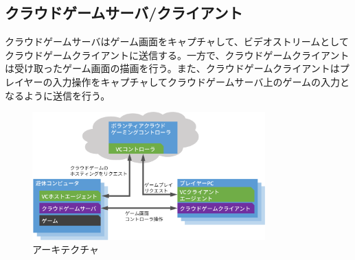 \subsection{クラウドゲームサーバ/クライアント}
クラウドゲームサーバはゲーム画面をキャプチャして、ビデオストリームとしてクラウドゲームクライアントに送信する。一方で、クラウドゲームクライアントは受け取ったゲーム画面の描画を行う。また、クラウドゲームクライアントはプレイヤーの入力操作をキャプチャしてクラウドゲームサーバ上のゲームの入力となるように送信を行う。

\begin{figure}[t]
    \centering
    \includegraphics[width=0.8\textwidth,keepaspectratio,clip]{img/architecture.eps}
    \caption{アーキテクチャ}
    \label{fig:arch}
\end{figure}
